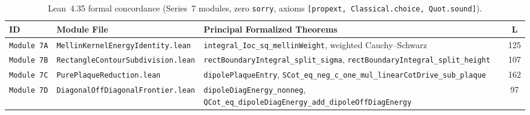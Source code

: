 \documentclass[10pt,a4paper]{article}
\theoremstyle{definition}
\begin{document}
\begin{table}[htbp]
\centering
\scriptsize
\begin{tabular}{@{}l>{\raggedright\arraybackslash}p{4.9cm}>{\raggedright\arraybackslash}p{7.1cm}c@{}}
\toprule
ID & Module File & Principal Formalized Theorems & L \\
\midrule
\texttt{Module~7A} & \texttt{MellinKernelEnergyIdentity.lean} & \texttt{integral\_Ioc\_sq\_mellinWeight}, weighted Cauchy--Schwarz & 125 \\
\texttt{Module~7B} & \texttt{RectangleContourSubdivision.lean} & \texttt{rectBoundaryIntegral\_\allowbreak split\_sigma}, \texttt{rectBoundaryIntegral\_\allowbreak split\_height} & 107 \\
\texttt{Module~7C} & \texttt{PurePlaqueReduction.lean} & \texttt{dipolePlaqueEntry}, \texttt{SCot\_eq\_neg\_\allowbreak c\_one\_mul\_\allowbreak linearCotDrive\_sub\_plaque} & 162 \\
\texttt{Module~7D} & \texttt{DiagonalOffDiagonalFrontier.lean} & \texttt{dipoleDiagEnergy\_nonneg}, \texttt{QCot\_eq\_\allowbreak dipoleDiagEnergy\_\allowbreak add\_dipoleOffDiagEnergy} & 97 \\
\bottomrule
\end{tabular}
\caption{Lean~4.35 formal concordance (Series~7 modules, zero \texttt{sorry}, axioms \texttt{[propext, Classical.choice, Quot.sound]}).}
\label{tab:series7_concordance}
\end{table}



\end{document}
